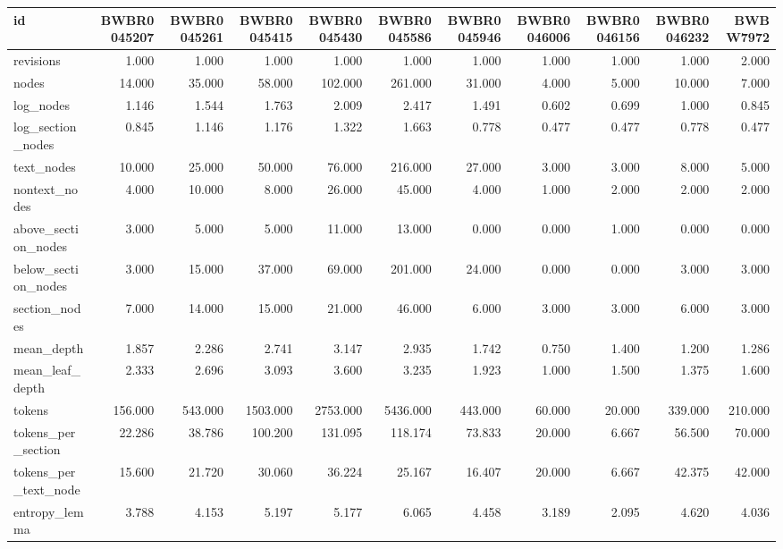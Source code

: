 \begin{tabular}{lrrrrrrrrrr}
\toprule
id & BWBR0045207 & BWBR0045261 & BWBR0045415 & BWBR0045430 & BWBR0045586 & BWBR0045946 & BWBR0046006 & BWBR0046156 & BWBR0046232 & BWBW7972 \\
\midrule
revisions & 1.000 & 1.000 & 1.000 & 1.000 & 1.000 & 1.000 & 1.000 & 1.000 & 1.000 & 2.000 \\
\cline{1-11}
nodes & 14.000 & 35.000 & 58.000 & 102.000 & 261.000 & 31.000 & 4.000 & 5.000 & 10.000 & 7.000 \\
\cline{1-11}
log\_nodes & 1.146 & 1.544 & 1.763 & 2.009 & 2.417 & 1.491 & 0.602 & 0.699 & 1.000 & 0.845 \\
\cline{1-11}
log\_section\_nodes & 0.845 & 1.146 & 1.176 & 1.322 & 1.663 & 0.778 & 0.477 & 0.477 & 0.778 & 0.477 \\
\cline{1-11}
text\_nodes & 10.000 & 25.000 & 50.000 & 76.000 & 216.000 & 27.000 & 3.000 & 3.000 & 8.000 & 5.000 \\
\cline{1-11}
nontext\_nodes & 4.000 & 10.000 & 8.000 & 26.000 & 45.000 & 4.000 & 1.000 & 2.000 & 2.000 & 2.000 \\
\cline{1-11}
above\_section\_nodes & 3.000 & 5.000 & 5.000 & 11.000 & 13.000 & 0.000 & 0.000 & 1.000 & 0.000 & 0.000 \\
\cline{1-11}
below\_section\_nodes & 3.000 & 15.000 & 37.000 & 69.000 & 201.000 & 24.000 & 0.000 & 0.000 & 3.000 & 3.000 \\
\cline{1-11}
section\_nodes & 7.000 & 14.000 & 15.000 & 21.000 & 46.000 & 6.000 & 3.000 & 3.000 & 6.000 & 3.000 \\
\cline{1-11}
mean\_depth & 1.857 & 2.286 & 2.741 & 3.147 & 2.935 & 1.742 & 0.750 & 1.400 & 1.200 & 1.286 \\
\cline{1-11}
mean\_leaf\_depth & 2.333 & 2.696 & 3.093 & 3.600 & 3.235 & 1.923 & 1.000 & 1.500 & 1.375 & 1.600 \\
\cline{1-11}
tokens & 156.000 & 543.000 & 1503.000 & 2753.000 & 5436.000 & 443.000 & 60.000 & 20.000 & 339.000 & 210.000 \\
\cline{1-11}
tokens\_per\_section & 22.286 & 38.786 & 100.200 & 131.095 & 118.174 & 73.833 & 20.000 & 6.667 & 56.500 & 70.000 \\
\cline{1-11}
tokens\_per\_text\_node & 15.600 & 21.720 & 30.060 & 36.224 & 25.167 & 16.407 & 20.000 & 6.667 & 42.375 & 42.000 \\
\cline{1-11}
entropy\_lemma & 3.788 & 4.153 & 5.197 & 5.177 & 6.065 & 4.458 & 3.189 & 2.095 & 4.620 & 4.036 \\

\end{tabular}
